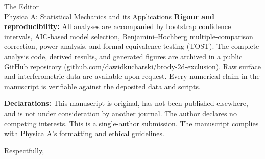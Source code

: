\documentclass{letter}
\begin{document}
\begin{letter}{The Editor\\Physica A: Statistical Mechanics and its Applications}
\textbf{Rigour and reproducibility:} All analyses are accompanied by bootstrap confidence intervals, AIC-based model selection, Benjamini--Hochberg multiple-comparison correction, power analysis, and formal equivalence testing (TOST). The complete analysis code, derived results, and generated figures are archived in a public GitHub repository (github.com/dawidkucharski/brody-2d-exclusion). Raw surface and interferometric data are available upon request. Every numerical claim in the manuscript is verifiable against the deposited data and scripts.

\textbf{Declarations:} This manuscript is original, has not been published elsewhere, and is not under consideration by another journal. The author declares no competing interests. This is a single-author submission. The manuscript complies with Physica A's formatting and ethical guidelines.

\closing{Respectfully,}

\end{letter}
\end{document}
